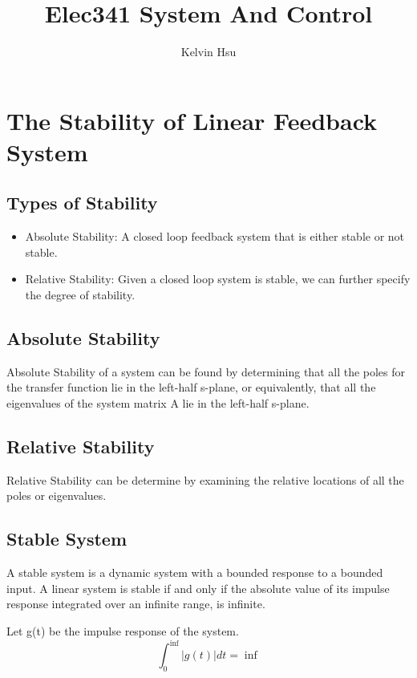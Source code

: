 \documentclass{article}
\title{Elec341 System And Control}
\author{Kelvin Hsu}
\begin{document}
    \sffamily
       \maketitle
       \newpage

    \section*{The Stability of Linear Feedback System}
    \subsection*{Types of Stability}
    \begin{itemize}
        \item Absolute Stability: A closed loop feedback system that is either stable or not stable.
        \item Relative Stability: Given a closed loop system is stable, we can further 
                                  specify the degree of stability.
    \end{itemize}

    \subsection*{Absolute Stability}
    Absolute Stability of a system can be found by determining that all the poles for the transfer function lie in the left-half 
    s-plane, or equivalently, that all the eigenvalues of the system matrix A lie in the left-half s-plane.

    \subsection*{Relative Stability}
    Relative Stability can be determine by examining the relative locations of all the poles or eigenvalues.

    \subsection*{Stable System}
    A stable system is a dynamic system with a bounded response to a bounded input.
    A linear system is stable if and only if the absolute value of its impulse response integrated over 
    an infinite range, is infinite.\par
    Let g(t) be the impulse response of the system.
    \begin{equation*}
        \int_{0}^{\inf} |g(t)| dt = \inf
    \end{equation*}
\end{document}
